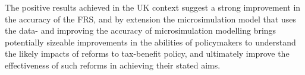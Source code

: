 \documentclass[10pt,journal,compsoc]{IEEEtran}
\begin{document}
The positive results achieved in the UK context suggest a strong improvement in the accuracy of the FRS, and by extension the microsimulation model that uses the data- and improving the accuracy of microsimulation modelling brings potentially sizeable improvements in the abilities of policymakers to understand the likely impacts of reforms to tax-benefit policy, and ultimately improve the effectiveness of such reforms in achieving their stated aims.





%
%
%

\newpage




\end{document}

